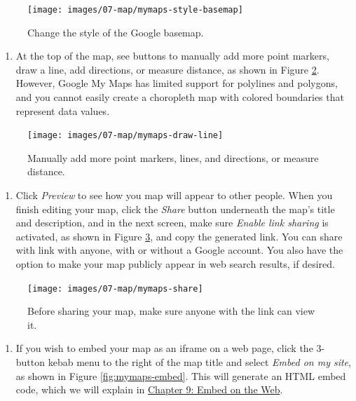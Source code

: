 \documentclass[
  english,
]{book}
\providecommand{\tightlist}{%
  \setlength{\itemsep}{0pt}\setlength{\parskip}{0pt}}
\begin{document}
\begin{figure}
\texttt{[image: images/07-map/mymaps-style-basemap]} \caption{Change the style of the Google basemap.}\label{fig:mymaps-style-basemap}
\end{figure}

\begin{enumerate}
\def\labelenumi{\arabic{enumi}.}
\setcounter{enumi}{15}
\tightlist
\item
  At the top of the map, see buttons to manually add more point markers, draw a line, add directions, or measure distance, as shown in Figure \ref{fig:mymaps-draw-line}. However, Google My Maps has limited support for polylines and polygons, and you cannot easily create a choropleth map with colored boundaries that represent data values.
\end{enumerate}



\begin{figure}
\texttt{[image: images/07-map/mymaps-draw-line]} \caption{Manually add more point markers, lines, and directions, or measure distance.}\label{fig:mymaps-draw-line}
\end{figure}

\begin{enumerate}
\def\labelenumi{\arabic{enumi}.}
\setcounter{enumi}{16}
\tightlist
\item
  Click \emph{Preview} to see how you map will appear to other people. When you finish editing your map, click the \emph{Share} button underneath the map's title and description, and in the next screen, make sure \emph{Enable link sharing} is activated, as shown in Figure \ref{fig:mymaps-share}, and copy the generated link. You can share with link with anyone, with or without a Google account. You also have the option to make your map publicly appear in web search results, if desired.
\end{enumerate}



\begin{figure}
\texttt{[image: images/07-map/mymaps-share]} \caption{Before sharing your map, make sure anyone with the link can view it.}\label{fig:mymaps-share}
\end{figure}

\begin{enumerate}
\def\labelenumi{\arabic{enumi}.}
\setcounter{enumi}{17}
\tightlist
\item
  If you wish to embed your map as an iframe on a web page, click the 3-button kebab menu to the right of the map title and select \emph{Embed on my site}, as shown in Figure \ref{fig:mymaps-embed}. This will generate an HTML embed code, which we will explain in \href{embed.html}{Chapter 9: Embed on the Web}.
\end{enumerate}
\end{document}

